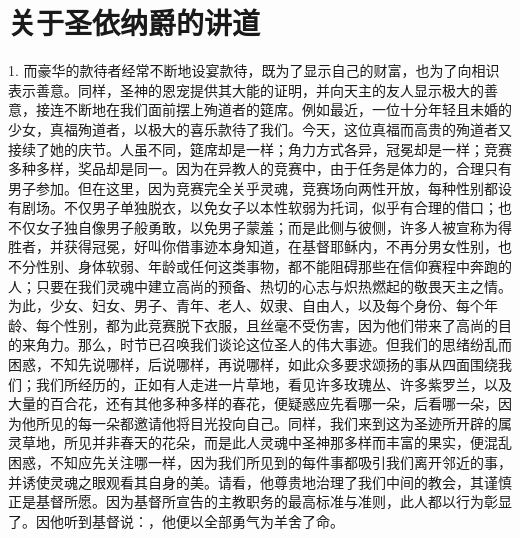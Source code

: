 
\chapter{关于圣依纳爵的讲道}


\par

1. 而豪华的款待者经常不断地设宴款待，既为了显示自己的财富，也为了向相识表示善意。同样，圣神的恩宠提供其大能的证明，并向天主的友人显示极大的善意，接连不断地在我们面前摆上殉道者的筵席。例如最近，一位十分年轻且未婚的少女，真福殉道者，以极大的喜乐款待了我们。今天，这位真福而高贵的殉道者又接续了她的庆节。人虽不同，筵席却是一样；角力方式各异，冠冕却是一样；竞赛多种多样，奖品却是同一。因为在异教人的竞赛中，由于任务是体力的，合理只有男子参加。但在这里，因为竞赛完全关乎灵魂，竞赛场向两性开放，每种性别都设有剧场。不仅男子单独脱衣，以免女子以本性软弱为托词，似乎有合理的借口；也不仅女子独自像男子般勇敢，以免男子蒙羞；而是此侧与彼侧，许多人被宣称为得胜者，并获得冠冕，好叫你借事迹本身知道，在基督耶稣内，不再分男女性别，也不分性别、身体软弱、年龄或任何这类事物，都不能阻碍那些在信仰赛程中奔跑的人；只要在我们灵魂中建立高尚的预备、热切的心志与炽热燃起的敬畏天主之情。为此，少女、妇女、男子、青年、老人、奴隶、自由人，以及每个身份、每个年龄、每个性别，都为此竞赛脱下衣服，且丝毫不受伤害，因为他们带来了高尚的目的来角力。那么，时节已召唤我们谈论这位圣人的伟大事迹。但我们的思绪纷乱而困惑，不知先说哪样，后说哪样，再说哪样，如此众多要求颂扬的事从四面围绕我们；我们所经历的，正如有人走进一片草地，看见许多玫瑰丛、许多紫罗兰，以及大量的百合花，还有其他多种多样的春花，便疑惑应先看哪一朵，后看哪一朵，因为他所见的每一朵都邀请他将目光投向自己。同样，我们来到这为圣迹所开辟的属灵草地，所见并非春天的花朵，而是此人灵魂中圣神那多样而丰富的果实，便混乱困惑，不知应先关注哪一样，因为我们所见到的每件事都吸引我们离开邻近的事，并诱使灵魂之眼观看其自身的美。请看，他尊贵地治理了我们中间的教会，其谨慎正是基督所愿。因为基督所宣告的主教职务的最高标准与准则，此人都以行为彰显了。因他听到基督说：，他便以全部勇气为羊舍了命。\par

